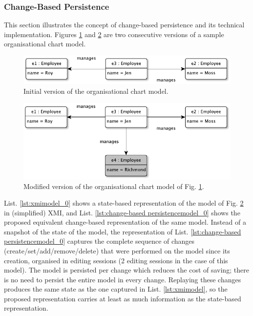 \documentclass[12pt, a4paper]{report} \usepackage[titletoc]{appendix}
\begin{document}
\subsubsection{Change-Based Persistence}
\label{change-based_persistence}
This section illustrates the concept of change-based persistence and its technical implementation. Figures \ref{fig:initial_chart_0} and \ref{fig:modified_chart} are two consecutive versions of a sample organisational chart model. 

\begin{figure}[ht]
	\centering
	\includegraphics[width=\linewidth]{initial_chart_0}
	\caption{Initial version of the organisational chart model.}
	\label{fig:initial_chart_0}
\end{figure}

\begin{figure}[ht]
	\centering
	\includegraphics[width=\linewidth]{modified_chart}
	\caption{Modified version of the organisational chart model of Fig. \ref{fig:initial_chart_0}.}
	\label{fig:modified_chart}
\end{figure}

List. \ref{lst:xmimodel_0} shows a state-based representation of the model of Fig. \ref{fig:modified_chart} in (simplified) XMI, and List. \ref{lst:change-based persistencemodel_0} shows the proposed equivalent change-based representation of the same model. Instead of a snapshot of the state of the model, the representation of List. \ref{lst:change-based persistencemodel_0} captures the complete sequence of changes (create/set/add/remove/delete) that were performed on the model since its creation, organised in editing sessions (2 editing sessions in the case of this model). The model is persisted per change which reduces the cost of saving; there is no need to persist the entire model in every change.  Replaying these changes produces the same state as the one captured in List. \ref{lst:xmimodel}, so the proposed representation carries at least as much information as the state-based representation.
\end{document}
